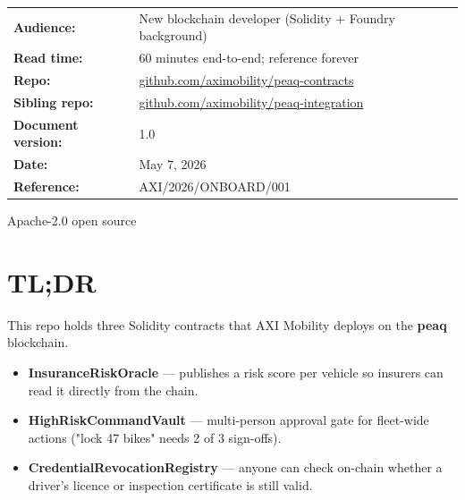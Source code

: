 \documentclass[11pt,a4paper]{article}
\begin{document}
\begin{center}
\begin{tabular}{p{4.5cm} p{9.5cm}}
\textbf{\color{axidark}Audience:} & New blockchain developer (Solidity + Foundry background) \\
\textbf{\color{axidark}Read time:} & 60 minutes end-to-end; reference forever \\
\textbf{\color{axidark}Repo:} & \href{https://github.com/aximobility/peaq-contracts}{github.com/aximobility/peaq-contracts} \\
\textbf{\color{axidark}Sibling repo:} & \href{https://github.com/aximobility/peaq-integration}{github.com/aximobility/peaq-integration} \\
\textbf{\color{axidark}Document version:} & 1.0 \\
\textbf{\color{axidark}Date:} & May 7, 2026 \\
\textbf{\color{axidark}Reference:} & AXI/2026/ONBOARD/001 \\
\end{tabular}
\end{center}

\vspace{0.6cm}

\begin{center}
{\small\color{axigray} Apache-2.0 open source}
\end{center}

\newpage

\section{TL;DR}

This repo holds three Solidity contracts that AXI Mobility deploys on the \textbf{peaq} blockchain.

\begin{itemize}[leftmargin=*]
  \item \textbf{InsuranceRiskOracle} --- publishes a risk score per vehicle so insurers can read it directly from the chain.
  \item \textbf{HighRiskCommandVault} --- multi-person approval gate for fleet-wide actions ("lock 47 bikes" needs 2 of 3 sign-offs).
  \item \textbf{CredentialRevocationRegistry} --- anyone can check on-chain whether a driver's licence or inspection certificate is still valid.
\end{itemize}
\end{document}
